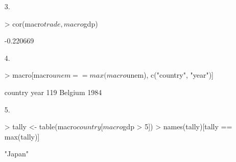 \documentclass[handout]{beamer}
\newcommand{\red}{\color{red}}
\begin{document}
\begin{frame}[fragile]
\begin{enumerate}
\red
\footnotesize
\item[3.]
\begin{Schunk}
\begin{Sinput}
> cor(macro$trade, macro$gdp)
\end{Sinput}
\begin{Soutput}
[1] -0.220669
\end{Soutput}
\end{Schunk}
\item[4.]
\begin{Schunk}
\begin{Sinput}
> macro[macro$unem == max(macro$unem), c("country", "year")]
\end{Sinput}
\begin{Soutput}
    country year
119 Belgium 1984
\end{Soutput}
\end{Schunk}
\item[5.]
\begin{Schunk}
\begin{Sinput}
> tally <- table(macro$country[macro$gdp > 5])
> names(tally)[tally == max(tally)]
\end{Sinput}
\begin{Soutput}
[1] "Japan"
\end{Soutput}
\end{Schunk}
\end{enumerate}
\end{frame}
\end{document}
